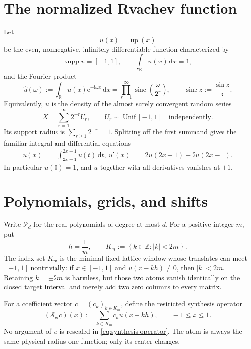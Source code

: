 \documentclass[11pt,oneside]{book}
\theoremstyle{definition}
\theoremstyle{remark}
\DeclareMathOperator{\supp}{supp}
\newcommand{\R}{\mathbb R}
\newcommand{\Z}{\mathbb Z}
\newcommand{\Pp}{\mathcal P}
\newcommand{\Sop}{\mathcal S}
\newcommand{\dd}{\,\mathrm d}
\newcommand{\e}{\mathrm e}
\newcommand{\iu}{\mathrm i}
\newcommand{\abs}[1]{\left\lvert#1\right\rvert}
\newcommand{\set}[1]{\left\{#1\right\}}
\begin{document}
\section{The normalized Rvachev function}
Let
\[
 u(x)=\operatorname{up}(x)
\]
be the even, nonnegative, infinitely differentiable function characterized by
\begin{equation}
 \supp u=[-1,1],\qquad \int_{\R}u(x)\dd x=1,
 \label{eq:up-normalization}
\end{equation}
and the Fourier product
\begin{equation}
 \widehat u(\omega)
 :=\int_{\R}u(x)\e^{-\iu\omega x}\dd x
 =\prod_{r=1}^{\infty}\operatorname{sinc}\!\left(\frac{\omega}{2^r}\right),
 \qquad \operatorname{sinc}z:=\frac{\sin z}{z}.
 \label{eq:up-fourier-product}
\end{equation}
Equivalently, \(u\) is the density of the almost surely convergent random series
\begin{equation}
 X=\sum_{r=1}^{\infty}2^{-r}U_r,
 \qquad U_r\sim\operatorname{Unif}[-1,1]
 \quad\text{independently}.
 \label{eq:up-random-series}
\end{equation}
Its support radius is \(\sum_{r\ge1}2^{-r}=1\).  Splitting off the first summand gives the familiar integral and differential equations
\begin{align}
 u(x)&=\int_{2x-1}^{2x+1}u(t)\dd t,\label{eq:up-integral}\
 u'(x)&=2u(2x+1)-2u(2x-1).\label{eq:up-differential}
\end{align}
In particular \(u(0)=1\), and \(u\) together with all derivatives vanishes at \(\pm1\).

\section{Polynomials, grids, and shifts}
Write \(\Pp_d\) for the real polynomials of degree at most \(d\).  For a positive integer \(m\), put
\[
 h=\frac1m,
 \qquad
 K_m:=\set{k\in\Z:\abs{k}<2m}.
 \label{eq:Km}
\]
The index set \(K_m\) is the minimal fixed lattice window whose translates can meet \([-1,1]\) nontrivially: if \(x\in[-1,1]\) and \(u(x-kh)\ne0\), then \(|k|<2m\).  Retaining \(k=\pm2m\) is harmless, but those two atoms vanish identically on the closed target interval and merely add two zero columns to every matrix.

For a coefficient vector \(c=(c_k)_{k\in K_m}\), define the restricted synthesis operator
\begin{equation}
 (\Sop_m c)(x):=\sum_{k\in K_m}c_k u(x-kh),
 \qquad -1\le x\le1.
 \label{eq:synthesis-operator}
\end{equation}
No argument of \(u\) is rescaled in \cref{eq:synthesis-operator}.  The atom is always the same physical radius-one function; only its center changes.
\end{document}
